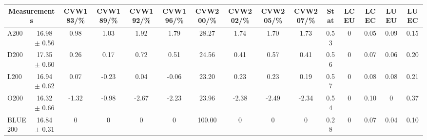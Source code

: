 \begin{table}[H]
\scriptsize
\begin{center}
\renewcommand{\arraystretch}{1.1}
\begin{tabular}{|lc|c|c|c|c|c|c|c|c|ccccc|}
\hline
\multicolumn{2}{|c|}{Measurements} & CVW{\tiny 183}/\%  & CVW{\tiny 189}/\%  & CVW{\tiny 192}/\%  & CVW{\tiny 196}/\%  & CVW{\tiny 200}/\%  & CVW{\tiny 202}/\%  & CVW{\tiny 205}/\%  & CVW{\tiny 207}/\%  & {\tiny Stat} & {\tiny LCEU} & {\tiny LCEC} & {\tiny LUEU} & {\tiny LUEC}\\
\hline
A200 &      16.98 $\pm$       0.56 &       0.98 &       1.03 &       1.92 &       1.79 &      28.27 &       1.74 &       1.70 &       1.73 &       0.53 &  0 &       0.05 &       0.09 &       0.15\\
D200 &      17.35 $\pm$       0.60 &       0.26 &       0.17 &       0.72 &       0.51 &      24.56 &       0.41 &       0.57 &       0.41 &       0.56 &  0 &       0.07 &       0.06 &       0.20\\
L200 &      16.94 $\pm$       0.62 &       0.07 &      -0.23 &       0.04 &      -0.06 &      23.20 &       0.23 &       0.23 &       0.19 &       0.57 &  0 &       0.08 &       0.08 &       0.21\\
O200 &      16.32 $\pm$       0.66 &      -1.32 &      -0.98 &      -2.67 &      -2.23 &      23.96 &      -2.38 &      -2.49 &      -2.34 &       0.54 &  0 &       0.10 &  0 &       0.37\\
\hline
BLUE {\tiny 200} &      16.84 $\pm$       0.31 &  0 &  0 &  0 &  0 &     100.00 &  0 &  0 &  0 &       0.28 &  0 &       0.07 &       0.04 &       0.10\\
\hline
\end{tabular}
\renewcommand{\arraystretch}{1}
\end{center}
\end{table}
\vspace*{-0.5cm}
